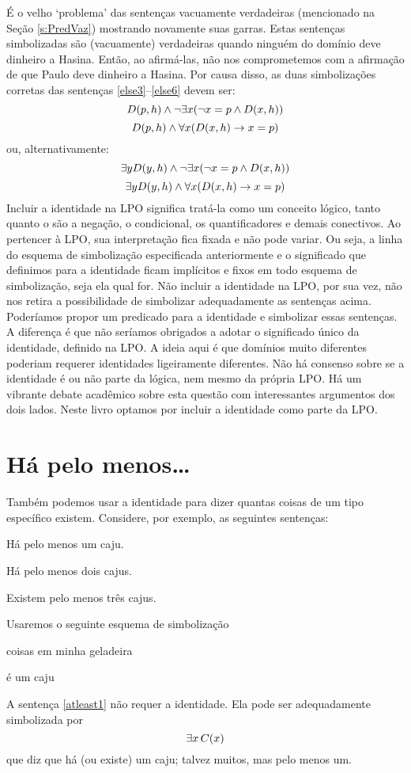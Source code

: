 É o velho `problema' das sentenças vacuamente verdadeiras (mencionado na Seção \ref{s:PredVaz}) mostrando novamente suas garras.
Estas sentenças simbolizadas são (vacuamente) verdadeiras quando ninguém do domínio deve dinheiro a Hasina.
Então, ao afirmá-las, não nos comprometemos com a afirmação de que Paulo deve dinheiro a Hasina.
Por causa disso, as duas simbolizações corretas das sentenças \ref{else3}--\ref{else6} devem ser:
$$\mathord{D}(p,h)\wedge \neg\exists x(\neg x = p \wedge \mathord{D}(x,h))$$
$$\mathord{D}(p,h)\wedge \forall x (\mathord{D}(x,h) \rightarrow x = p)$$
ou, alternativamente:
$$\exists y \mathord{D}(y,h)\wedge \neg\exists x(\neg x = p \wedge \mathord{D}(x,h))$$
$$\exists y \mathord{D}(y,h)\wedge \forall x (\mathord{D}(x,h) \rightarrow x = p)$$
Incluir a identidade na LPO significa tratá-la como um conceito lógico, tanto quanto o são a negação, o condicional, os quantificadores e demais conectivos.
Ao pertencer à LPO, sua interpretação fica fixada e não pode variar.
Ou seja, a linha do esquema de simbolização especificada anteriormente e o significado que definimos para a identidade ficam implícitos e fixos em todo esquema de simbolização, seja ela qual for.
Não incluir a identidade na LPO, por sua vez, não nos retira a possibilidade de simbolizar adequadamente as sentenças acima.
Poderíamos propor um predicado para a identidade e simbolizar essas sentenças.
A diferença é que não seríamos obrigados a adotar o significado único da identidade, definido na LPO.
A ideia aqui é que domínios muito diferentes poderiam requerer identidades ligeiramente diferentes.
Não há consenso sobre se a identidade é ou não parte da lógica, nem mesmo da própria LPO.
Há um vibrante debate acadêmico sobre esta questão com interessantes argumentos dos dois lados.
Neste livro optamos por incluir a identidade como parte da LPO.


\section{Há pelo menos\ldots}\label{s:HaPeloMenos}
Também podemos usar a identidade para dizer quantas coisas de um tipo específico existem. Considere, por exemplo, as seguintes sentenças:
\begin{earg}
\item[\ex{atleast1}] Há pelo menos um caju.
\item[\ex{atleast2}] Há pelo menos dois cajus.
\item[\ex{atleast3}] Existem pelo menos três cajus.
\end{earg}
Usaremos o seguinte esquema de simbolização
	\begin{center}
	\begin{ekey}
		\item[\text{domínio}] coisas em minha geladeira
		\item[\atom{C}{x}]  é um caju
	\end{ekey}
	\end{center}
A sentença \ref{atleast1} não requer a identidade.
Ela pode ser adequadamente simbolizada por
$$\exists x\, \mathord{C}(x)$$
que diz que há (ou existe) um caju; talvez muitos, mas pelo menos um.

